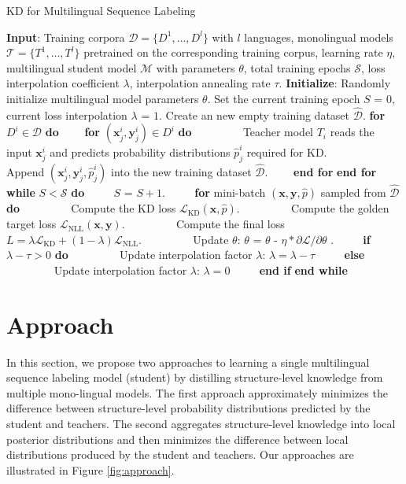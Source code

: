 \documentclass[11pt,a4paper]{article}
\newcommand{\xvec}{\mathbf{x}}
\newcommand{\yvec}{\mathbf{y}}
\newcommand{\mcL}{\mathcal{L}}
\newcommand{\mcT}{\mathcal{T}}
\begin{document}
\begin{algorithm}[t]
\small
\caption{KD for Multilingual Sequence Labeling}\label{alg:1}
\begin{algorithmic}[1]
\State \textbf{Input}: Training corpora $\mathcal{D}=\{D^1,\dots,D^l\}$ with $l$ languages, monolingual models $\mcT=\{T^1,\dots,T^l\}$ pretrained on the corresponding training corpus, learning rate $\eta$, multilingual student model $\mathcal{M}$ with parameters $\theta$, total training epochs $\mathcal{S}$, loss interpolation coefficient $\lambda$, interpolation annealing rate $\tau$. 
\State \textbf{Initialize}: Randomly initialize multilingual model parameters $\theta$. Set the current training epoch $S$ = $0$, current loss interpolation $\lambda$ = $1$. Create an new empty training dataset $\hat{\mathcal{D}}$.
\State 
\State \textbf{for} $D^i\in \mathcal{D}$ \textbf{do}
\State ~~~~\textbf{for} $(\xvec^i_j,\yvec^i_j) \in D^i$ \textbf{do}
\State ~~~~~~~~ Teacher model $T_i$ reads the input $\xvec^i_j$ and predicts probability distributions $\hat{p}^i_j$ required for KD.
\State ~~~~~~~~ Append $(\xvec^i_j,\yvec^i_j,\hat{p}^i_j)$ into the new training dataset $\hat{\mathcal{D}}$.
\State ~~~~\textbf{end for}
\State \textbf{end for}
\State 
\State \textbf{while} $S < \mathcal{S}$ \textbf{do}
\State ~~~~ $S$ = $S+1$.
\State ~~~~ \textbf{for} mini-batch $(\xvec,\yvec,\hat{p})$ sampled from $\hat{\mathcal{D}}$ \textbf{do}
\State ~~~~~~~~ Compute the KD loss $\mcL_{\text{KD}}(\xvec,\hat{p})$.
\State ~~~~~~~~ Compute the golden target loss $\mcL_{\text{NLL}}(\xvec,\yvec)$.
\State ~~~~~~~~ Compute the final loss $L=\lambda \mcL_{\text{KD}}+(1-\lambda)\mcL_{\text{NLL}}$.
\State ~~~~~~~~ Update $\theta$: $\theta$ = $\theta$ - $\eta * \partial \mathcal{L} / \partial \theta$ .
\State ~~~~ \textbf{if} $\lambda - \tau > 0$ \textbf{do}
\State ~~~~~~~~ Update interpolation factor $\lambda$: $\lambda = \lambda - \tau$ 
\State ~~~~ \textbf{else} 
\State ~~~~~~~~ Update interpolation factor $\lambda$: $\lambda = 0$
\State ~~~~ \textbf{end if}
\State \textbf{end while}
\end{algorithmic}
\end{algorithm}



\section{Approach}
In this section, we propose two approaches to learning a single multilingual sequence labeling model (student) by distilling structure-level knowledge from multiple mono-lingual models. The first approach approximately minimizes the difference between structure-level probability distributions predicted by the student and teachers. The second aggregates structure-level knowledge into local posterior distributions and then minimizes the difference between local distributions produced by the student and teachers. Our approaches are illustrated in Figure \ref{fig:approach}.
\end{document}
